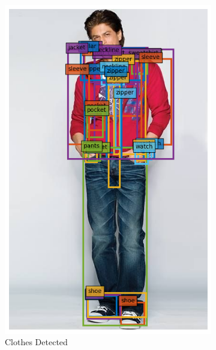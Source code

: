 \begin{figure}[H]
\begin{subfigure}[b]{0.3\textwidth}
        \includegraphics[width=\textwidth]{images/detected_imgae.png}
        \caption{Clothes Detected}
    \end{subfigure}
    \begin{subfigure}[b]{0.2\textwidth}

\end{subfigure}
\end{figure}

